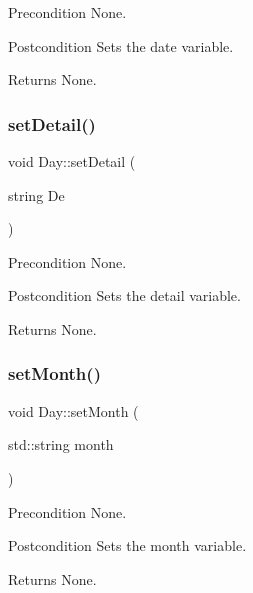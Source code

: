 \begin{DoxyPrecond}{Precondition}
None. 
\end{DoxyPrecond}
\begin{DoxyPostcond}{Postcondition}
Sets the date variable. 
\end{DoxyPostcond}
\begin{DoxyReturn}{Returns}
None. 
\end{DoxyReturn}
\hypertarget{class_day_acb0181b89543f4a0e71f85d5ddb78651}{}\label{class_day_acb0181b89543f4a0e71f85d5ddb78651} 
\subsubsection{\texorpdfstring{set\+Detail()}{setDetail()}}
{\footnotesize\ttfamily void Day\+::set\+Detail (\begin{DoxyParamCaption}\item[{string}]{De }\end{DoxyParamCaption})}

\begin{DoxyPrecond}{Precondition}
None. 
\end{DoxyPrecond}
\begin{DoxyPostcond}{Postcondition}
Sets the detail variable. 
\end{DoxyPostcond}
\begin{DoxyReturn}{Returns}
None. 
\end{DoxyReturn}
\hypertarget{class_day_aa6fc8b1b08074305e6b0dd3f4bc21151}{}\label{class_day_aa6fc8b1b08074305e6b0dd3f4bc21151} 
\subsubsection{\texorpdfstring{set\+Month()}{setMonth()}}
{\footnotesize\ttfamily void Day\+::set\+Month (\begin{DoxyParamCaption}\item[{std\+::string}]{month }\end{DoxyParamCaption})}

\begin{DoxyPrecond}{Precondition}
None. 
\end{DoxyPrecond}
\begin{DoxyPostcond}{Postcondition}
Sets the month variable. 
\end{DoxyPostcond}
\begin{DoxyReturn}{Returns}
None. 
\end{DoxyReturn}
\hypertarget{class_day_a40f873f51621bdb3cf657e127d43cdaf}{}\label{class_day_a40f873f51621bdb3cf657e127d43cdaf} 
